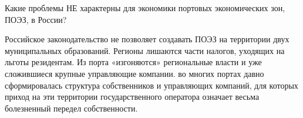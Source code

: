 \documentclass[12pt, table]{exam}
\begin{document}
\begin{questions}
\begin{multicols}{2}
\question Какие проблемы НЕ характерны для экономики портовых экономических зон, ПОЭЗ, в России?
\begin{choices}
	\CC Российское законодательство не позволяет создавать ПОЭЗ на территории двух муниципальных образований.
	\choice Регионы лишаются части налогов, уходящих
	на льготы резидентам.
	\choice Из порта «изгоняются» региональные власти и уже сложившиеся крупные управляющие	компании.
	\choice во многих портах давно сформировалась структура собственников и управляющих компаний, для которых приход на эти территории государственного оператора означает весьма болезненный передел 	собственности.
\end{choices}

\end{multicols}
\end{questions}
\end{document}
